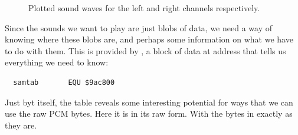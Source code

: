 \begin{figure}[H]
    \centering
    \begin{adjustbox}{width=12cm,center}
      \hspace{0.5cm}
    \end{adjustbox}
  \caption{Plotted sound waves for the left and right channels respectively.}
\end{figure}

Since the sounds we want to play are just blobs of data, we need a way of knowing where these blobs are, and perhaps
some information on what we have to do with them. This is provided by , a block of data at address
 that tells us everything we need to know:

\begin{lstlisting}
  samtab       EQU $9ac800
\end{lstlisting}

Just byt itself, the  table reveals some interesting potential for ways that we can use the
raw PCM bytes. Here it is in its raw form. With the bytes in  exactly as they are. 

